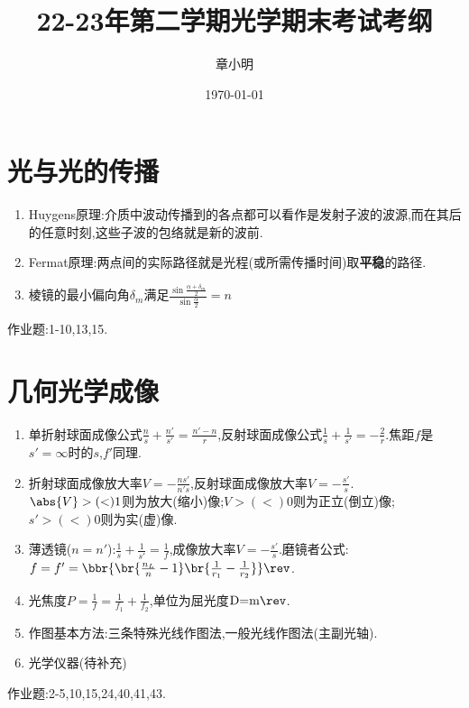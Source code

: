 \documentclass{article}
\title{22-23年第二学期光学期末考试考纲}
\author{章小明}
\date{\today}
\begin{document}
\maketitle
\tableofcontents

\section{光与光的传播}
\begin{enumerate}
    \item Huygens原理:介质中波动传播到的各点都可以看作是发射子波的波源,而在其后的任意时刻,这些子波的包络就是新的波前.
    \item Fermat原理:两点间的实际路径就是光程(或所需传播时间)取\textbf{平稳}的路径.
    \item 棱镜的最小偏向角$\delta_m$满足$\frac{\sin\frac{\alpha+\delta_m}{2}}{\sin\frac{\alpha}{2}}=n$
\end{enumerate}
作业题:1-10,13,15.
\section{几何光学成像}
\begin{enumerate}
    \item 单折射球面成像公式$\frac{n}{s}+\frac{n'}{s'}=\frac{n'-n}{r}$,反射球面成像公式$\frac{1}{s}+\frac{1}{s'}=-\frac{2}{r}$.焦距$f$是$s'=\infty$时的$s$,$f'$同理.
    \item 折射球面成像放大率$V=-\frac{ns'}{n's}$,反射球面成像放大率$V=-\frac{s'}{s}$.\\
    $\abs{V}>(<)1$则为放大(缩小)像;$V>(<)0$则为正立(倒立)像;$s'>(<)0$则为实(虚)像.
    \item 薄透镜($n=n'$):$\frac{1}{s}+\frac{1}{s'}=\frac{1}{f}$,成像放大率$V=-\frac{s'}{s}$.磨镜者公式:$f=f'=\bbr{\br{\frac{n_L}{n}-1}\br{\frac{1}{r_1}-\frac{1}{r_2}}}\rev$.
    \item 光焦度$P=\frac{1}{f}=\frac{1}{f_1}+\frac{1}{f_2}$,单位为屈光度$\text{D=m}\rev$.
    \item 作图基本方法:三条特殊光线作图法,一般光线作图法(主副光轴).
    \item 光学仪器(待补充)
\end{enumerate}
作业题:2-5,10,15,24,40,41,43.
\end{document}
